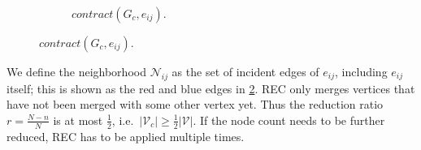 \begin{figure}[H]
\begin{minipage}{0.4\linewidth}
\begin{figure}[H]
			\caption{$\mathit{contract}(G_c, e_{i j})$.}\label{fig:coarse:rec}
		\end{figure}
	\end{minipage}
\end{figure}

We define the neighborhood $\mathcal{N}_{i j}$ as the set of incident edges of $e_{i j}$, including $e_{i j}$ itself;
this is shown as the red and blue edges in \cref{fig:coarse:rec}.
REC only merges vertices that have not been merged with some other vertex yet.
Thus the reduction ratio $r = \frac{N - n}{N}$ is at most $\frac{1}{2}$, i.e.\  $|\mathcal{V}_c| \geq \frac{1}{2} |\mathcal{V}|$.
If the node count needs to be further reduced, REC has to be applied multiple times.
